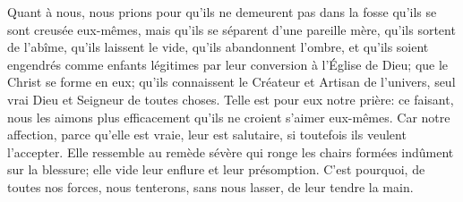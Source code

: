 Quant à nous, nous prions pour qu'ils ne demeurent pas
		dans la fosse qu'ils se sont creusée eux-mêmes,
	mais qu'ils se séparent d'une pareille mère, qu'ils sortent de l'abîme,
	qu'ils laissent le vide, qu'ils abandonnent l'ombre,
	et qu'ils soient engendrés comme enfants légitimes
		par leur conversion à l'Église de Dieu;
	que le Christ se forme en eux;
	qu'ils connaissent le Créateur et Artisan de l'univers,
	seul vrai Dieu et Seigneur de toutes choses.
Telle est pour eux notre prière:
	ce faisant, nous les aimons plus efficacement qu'ils ne croient s'aimer eux-mêmes.
Car notre affection, parce qu'elle est vraie, leur est salutaire,
	si toutefois ils veulent l'accepter.
Elle ressemble au remède sévère qui ronge les chairs formées indûment sur la blessure;
	elle vide leur enflure et leur présomption.
C'est pourquoi, de toutes nos forces,
	nous tenterons, sans nous lasser, de leur tendre la main.
